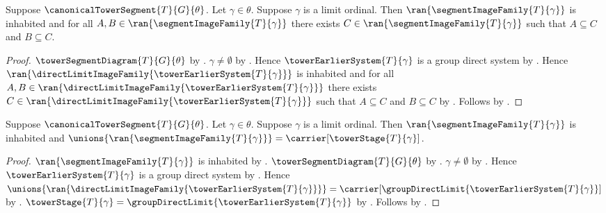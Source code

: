 \begin{theorem}\label{segment_image_family_limit_directed}
    Suppose $\canonicalTowerSegment{T}{G}{\theta}$.
    Let $\gamma\in\theta$.
    Suppose $\gamma$ is a limit ordinal.
    Then $\ran{\segmentImageFamily{T}{\gamma}}$ is inhabited and
        for all $A,B\in\ran{\segmentImageFamily{T}{\gamma}}$
        there exists $C\in\ran{\segmentImageFamily{T}{\gamma}}$ such that
            $A\subseteq C$ and $B\subseteq C$.
\end{theorem}
\begin{proof}
    $\towerSegmentDiagram{T}{G}{\theta}$ by
        .
    $\gamma\neq\emptyset$ by .
    Hence $\towerEarlierSystem{T}{\gamma}$ is a group direct system by
        .
    Hence $\ran{\directLimitImageFamily{
            \towerEarlierSystem{T}{\gamma}}}$ is inhabited and
        for all $A,B\in\ran{\directLimitImageFamily{
                \towerEarlierSystem{T}{\gamma}}}$
        there exists $C\in\ran{\directLimitImageFamily{
                \towerEarlierSystem{T}{\gamma}}}$ such that
            $A\subseteq C$ and $B\subseteq C$ by
        .
    Follows by .
\end{proof}

\begin{theorem}\label{segment_images_cover_limit_stage}
    Suppose $\canonicalTowerSegment{T}{G}{\theta}$.
    Let $\gamma\in\theta$.
    Suppose $\gamma$ is a limit ordinal.
    Then $\ran{\segmentImageFamily{T}{\gamma}}$ is inhabited and
        $\unions{\ran{\segmentImageFamily{T}{\gamma}}}=
            \carrier[\towerStage{T}{\gamma}]$.
\end{theorem}
\begin{proof}
    $\ran{\segmentImageFamily{T}{\gamma}}$ is inhabited by
        .
    $\towerSegmentDiagram{T}{G}{\theta}$ by
        .
    $\gamma\neq\emptyset$ by .
    Hence $\towerEarlierSystem{T}{\gamma}$ is a group direct system by
        .
    Hence $\unions{\ran{\directLimitImageFamily{
            \towerEarlierSystem{T}{\gamma}}}}=
        \carrier[\groupDirectLimit{
            \towerEarlierSystem{T}{\gamma}}]$ by
        .
    $\towerStage{T}{\gamma}=
        \groupDirectLimit{\towerEarlierSystem{T}{\gamma}}$ by
        .
    Follows by .
\end{proof}
